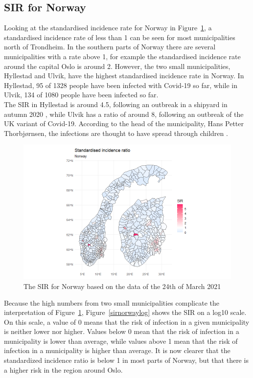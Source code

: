 \subsection{SIR for Norway}
Looking at the standardised incidence rate for Norway in Figure~\ref{sirnorway}, a standardised incidence rate of less than 1 can be seen for most municipalities north of Trondheim. In the southern parts of Norway there are several municipalities with a rate above 1, for example the standardised incidence rate around the capital Oslo is around 2. However, the two small municipalities, Hyllestad and Ulvik, have the highest standardised incidence rate in Norway. In Hyllestad, 95 of 1328 people have been infected with Covid-19 so far, while in Ulvik, 134 of 1080 people have been infected so far. \\
The SIR in Hyllestad is around 4.5, following an outbreak in a shipyard in autumn 2020 \cite{newspaper1}, while Ulvik has a ratio of around 8, following an outbreak of the UK variant of Covid-19. According to the head of the municipality, Hans Petter Thorbjørnsen, the infections are thought to have spread through children \cite{newspaper2}.
\begin{figure}[H]
 \centering
 \includegraphics[width = 1.2\textwidth]{sir_norway.png}
 \caption{The SIR for Norway based on the data of the 24th of March 2021}
 \label{sirnorway}
\end{figure}
Because the high numbers from two small municipalities complicate the interpretation of Figure~\ref{sirnorway}, Figure~\ref{sirnorwaylog} shows the SIR on a log10 scale. On this scale, a value of 0 means that the risk of infection in a given municipality is neither lower nor higher. Values below 0 mean that the risk of infection in a municipality is lower than average, while values above 1 mean that the risk of infection in a municipality is higher than average. It is now clearer that the standardized incidence ratio is below 1 in most parts of Norway, but that there is a higher risk in the region around Oslo.
